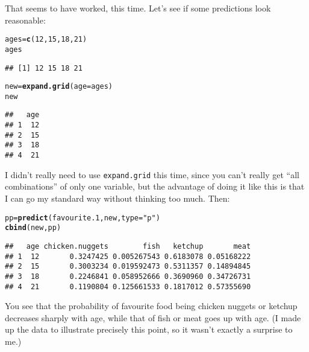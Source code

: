 \documentclass{article}\usepackage[]{graphicx}\usepackage[]{color}
\makeatletter
\newcommand{\hlnum}[1]{\textcolor[rgb]{0.686,0.059,0.569}{#1}}%
\newcommand{\hlstr}[1]{\textcolor[rgb]{0.192,0.494,0.8}{#1}}%
\newcommand{\hlstd}[1]{\textcolor[rgb]{0.345,0.345,0.345}{#1}}%
\newcommand{\hlkwb}[1]{\textcolor[rgb]{0.69,0.353,0.396}{#1}}%
\newcommand{\hlkwc}[1]{\textcolor[rgb]{0.333,0.667,0.333}{#1}}%
\newcommand{\hlkwd}[1]{\textcolor[rgb]{0.737,0.353,0.396}{\textbf{#1}}}%
\newenvironment{kframe}{%
 \def\at@end@of@kframe{}%
 \ifinner\ifhmode%
  \def\at@end@of@kframe{\end{minipage}}%
  \begin{minipage}{\columnwidth}%
 \fi\fi%
 \def\FrameCommand##1{\hskip\@totalleftmargin \hskip-\fboxsep
 \colorbox{shadecolor}{##1}\hskip-\fboxsep
     \hskip-\linewidth \hskip-\@totalleftmargin \hskip\columnwidth}%
 \MakeFramed {\advance\hsize-\width
   \@totalleftmargin\z@ \linewidth\hsize
   \@setminipage}}%
 {\par\unskip\endMakeFramed%
 \at@end@of@kframe}
\newenvironment{knitrout}{}{} %
\makeatother
\begin{document}
That seems to have worked, this time. Let's see if some predictions
look reasonable:

\begin{knitrout}
\color{fgcolor}\begin{kframe}
\begin{alltt}
\hlstd{ages}\hlkwb{=}\hlkwd{c}\hlstd{(}\hlnum{12}\hlstd{,}\hlnum{15}\hlstd{,}\hlnum{18}\hlstd{,}\hlnum{21}\hlstd{)}
\hlstd{ages}
\end{alltt}
\begin{verbatim}
## [1] 12 15 18 21
\end{verbatim}
\begin{alltt}
\hlstd{new}\hlkwb{=}\hlkwd{expand.grid}\hlstd{(}\hlkwc{age}\hlstd{=ages)}
\hlstd{new}
\end{alltt}
\begin{verbatim}
##   age
## 1  12
## 2  15
## 3  18
## 4  21
\end{verbatim}
\end{kframe}
\end{knitrout}

I didn't really need to use \texttt{expand.grid} this time, since you
can't really get ``all combinations'' of only one variable, but the
advantage of doing it like this is that I can go my standard way
without thinking too much. Then:

\begin{knitrout}
\color{fgcolor}\begin{kframe}
\begin{alltt}
\hlstd{pp}\hlkwb{=}\hlkwd{predict}\hlstd{(favourite.1,new,}\hlkwc{type}\hlstd{=}\hlstr{"p"}\hlstd{)}
\hlkwd{cbind}\hlstd{(new,pp)}
\end{alltt}
\begin{verbatim}
##   age chicken.nuggets        fish   ketchup       meat
## 1  12       0.3247425 0.005267543 0.6183078 0.05168222
## 2  15       0.3003234 0.019592473 0.5311357 0.14894845
## 3  18       0.2246841 0.058952666 0.3690960 0.34726731
## 4  21       0.1190804 0.125661533 0.1817012 0.57355690
\end{verbatim}
\end{kframe}
\end{knitrout}

You see that the probability of favourite food being chicken nuggets
or ketchup decreases sharply with age, while that of fish or meat goes
up with age. (I made up the data to illustrate precisely this point,
so it wasn't exactly a surprise to me.)
\end{document}
